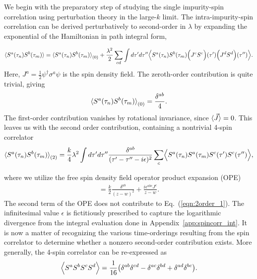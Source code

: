 \documentclass[aps,prb,twocolumn,superscriptaddress]{revtex4-1}
\begin{document}
We begin with the preparatory step of studying the single impurity-spin correlation using perturbation theory in the large-$k$ limit. The intra-impurity-spin correlation can be derived perturbatively to second-order in $\lambda$ by expanding the exponential of the Hamiltonian in path integral form,
\begin{widetext}
\begin{eqnarray}
\braket{S^{a}(\tau_{n})S^{b}(\tau_{m})}=\braket{S^{a}(\tau_{n})S^{b}(\tau_{m})}_{(0)}+\frac{\lambda^{2}}{2}\sum_{cd}\int d\tau'd\tau''\Bigl\langle{S^{a}(\tau_{n})S^{b}(\tau_{m})\Bigl(J^{c}S^{c}\Bigr)(\tau')\Bigl(J^{d}S^{d}\Bigr)(\tau'')\Bigr\rangle}. \nonumber 
\end{eqnarray}
Here, $J^{a}=\frac{1}{2}\psi^{\dagger}\sigma^{a}\psi$ is the spin density field. The zeroth-order contribution is quite trivial, giving 
\begin{eqnarray}
\braket{S^{a}(\tau_{n})S^{b}(\tau_{m})}_{(0)}=\frac{\delta^{ab}}{4}. \label{eqn:Sspin_corr}
\end{eqnarray}
The first-order contribution vanishes by rotational invariance, since $\braket{\vec{J}}=0$. This leaves us with the second order contribution, containing a nontrivial 4-spin correlator
\begin{eqnarray}
\braket{S^{a}(\tau_{n})S^{b}(\tau_{m})}_{(2)}=\frac{k}{4}\lambda^{2}\int d\tau'd\tau''\frac{\delta^{ab}}{(\tau'-\tau''-i\epsilon)^{2}}\sum_{c}\Bigl\langle{S^{a}(\tau_{n})S^{a}(\tau_{m})S^{c}(\tau')S^{c}(\tau'')\Bigr\rangle}, \label{eqn:2order_1}
\end{eqnarray}
\end{widetext}
where we utilize the free spin density field operator product expansion (OPE) 
\begin{eqnarray}
[J^{a}(z),J^{b}(w)]=\frac{k}{2}\frac{\delta^{ab}}{(z-w)^{2}}+\frac{i\epsilon^{abc}J^{c}}{z-w}. \label{eqn:J_OPE} 
\end{eqnarray}
The second term of the OPE does not contribute to Eq.~(\ref{eqn:2order_1}). The infinitesimal value $\epsilon$ is fictitiously prescribed to capture the logarithmic divergence from the integral evaluation done in Appendix~\ref{app:spincorr_int}. It is now a matter of recognizing the various time-orderings resulting from the spin correlator to determine whether a nonzero second-order contribution exists. More generally, the 4-spin correlator can be re-expressed as 
\begin{eqnarray}
\Bigl\langle{S^{a}S^{b}S^{c}S^{d}\Bigr\rangle}=\frac{1}{16}\bigl(\delta^{ab}\delta^{cd}-\delta^{ac}\delta^{bd}+\delta^{ad}\delta^{bc}\bigr). \label{eqn:Sdelta} 
\end{eqnarray}
\end{document}
